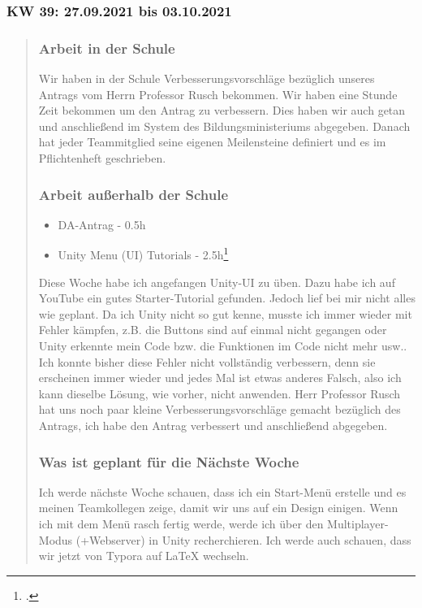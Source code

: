 \subsubsection{KW 39: 27.09.2021 bis 03.10.2021}
\begin{quote}
	\subsubsection*{Arbeit in der Schule}
	Wir haben in der Schule Verbesserungsvorschläge bezüglich unseres Antrags vom Herrn Professor Rusch bekommen. Wir haben eine Stunde Zeit bekommen um den Antrag zu verbessern. Dies haben wir auch getan und anschließend im System des Bildungsministeriums abgegeben. Danach hat jeder Teammitglied seine eigenen Meilensteine definiert und es im Pflichtenheft geschrieben.  
	
	\subsubsection*{Arbeit außerhalb der Schule}
	\begin{itemize}
		\item DA-Antrag - 0.5h
		\item Unity Menu (UI) Tutorials - 2.5h\footcite{MenuTutorial}
	\end{itemize}
	Diese Woche habe ich angefangen Unity-UI zu üben. Dazu habe ich auf YouTube ein gutes Starter-Tutorial gefunden. Jedoch lief bei mir nicht alles wie geplant. Da ich Unity nicht so gut kenne, musste ich immer wieder mit Fehler kämpfen, z.B. die Buttons sind auf einmal nicht gegangen oder Unity erkennte mein Code bzw. die Funktionen im Code nicht mehr usw.. Ich konnte bisher diese Fehler nicht vollständig verbessern, denn sie erscheinen immer wieder und jedes Mal ist etwas anderes Falsch, also ich kann dieselbe Lösung, wie vorher, nicht anwenden. Herr Professor Rusch hat uns noch paar kleine Verbesserungsvorschläge gemacht bezüglich des Antrags, ich habe den Antrag verbessert und anschließend abgegeben.    
	
	\subsubsection*{Was ist geplant für die Nächste Woche}
	Ich werde nächste Woche schauen, dass ich ein Start-Menü erstelle und es meinen Teamkollegen zeige, damit wir uns auf ein Design einigen. Wenn ich mit dem Menü rasch fertig werde, werde ich über den Multiplayer-Modus (+Webserver) in Unity recherchieren. Ich werde auch schauen, dass wir jetzt von Typora auf LaTeX wechseln. 
\end{quote}
